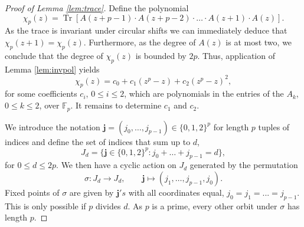 \documentclass[a4paper,reqno]{amsart}
\numberwithin{equation}{section}
\numberwithin{figure}{section}
\theoremstyle{remark}
\begin{document}
    
\begin{proof}[Proof of Lemma \ref{lem:trace}]
Define the polynomial
\[ \chi_p(z) = \operatorname{Tr}\left[A(z+p-1)\cdot A(z+p-2)\cdot\ldots\cdot A(z+1)\cdot A(z)\right] .\]
As the trace is invariant under circular shifts we can immediately deduce that $\chi_p(z+1) = \chi_p(z)$. Furthermore, as the degree of $A(z)$ is at most two, we conclude that the degree of $\chi_p(z)$ is bounded by $2p$. Thus, application of Lemma \ref{lem:invpol} yields
\begin{equation*}
    \chi_p(z)=c_0+c_1 (z^p-z)+c_2(z^p-z)^2,
\end{equation*}
for some coefficients $c_i$, $0\leq i\leq 2$, which are polynomials in the entries of the $A_k$, $0\leq k\leq 2$, over $\mathbb{F}_p$. It remains to determine $c_1$ and $c_2$.

We introduce the notation $\mathbf{j}=(j_0,\ldots,j_{p-1})\in \{0,1,2\}^p$ for length $p$ tuples of indices and define the set of indices that sum up to $d$,
  \begin{equation*}
      J_d=\{\mathbf{j}\in \{0,1,2\}^p:j_0+\ldots+j_{p-1}=d\},
  \end{equation*}
for $0\leq d\leq 2p$. We then have a cyclic action on $J_d$ generated by the permutation
\begin{equation*}
    \sigma: J_d\rightarrow J_d, \qquad \mathbf{j}\mapsto (j_1,\ldots,j_{p-1},j_0).
\end{equation*}
Fixed points of $\sigma$ are given by $\mathbf{j}'s$ with all coordinates equal,  $j_0=j_1=...=j_{p-1}$. This is only possible if $p$ divides $d$. As $p$ is a prime, every other orbit under $\sigma$ has length $p$.


\end{proof}
\end{document}
